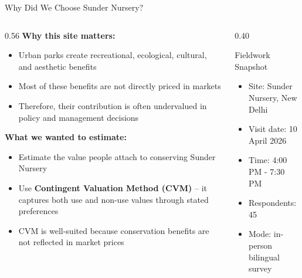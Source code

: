 \documentclass[10pt, aspectratio=169]{beamer}
\begin{document}
\begin{frame}{Why Did We Choose Sunder Nursery?}
    \begin{columns}[T]
        \begin{column}{0.56\textwidth}
            \textbf{Why this site matters:}
            \begin{itemize}
                \item Urban parks create recreational, ecological, cultural, and aesthetic benefits
                \item Most of these benefits are not directly priced in markets
                \item Therefore, their contribution is often undervalued in policy and management decisions
            \end{itemize}

            \vspace{0.5em}
            \textbf{What we wanted to estimate:}
            \begin{itemize}
                \item Estimate the value people attach to conserving Sunder Nursery
                \item Use \textbf{Contingent Valuation Method (CVM)} -- it captures both use and non-use values through stated preferences
                \item CVM is well-suited because conservation benefits are not reflected in market prices
            \end{itemize}
        \end{column}
        \begin{column}{0.40\textwidth}
            \begin{block}{Fieldwork Snapshot}
                \small
                \begin{itemize}
                    \item Site: Sunder Nursery, New Delhi
                    \item Visit date: 10 April 2026
                    \item Time: 4:00 PM - 7:30 PM
                    \item Respondents: 45
                    \item Mode: in-person bilingual survey
                \end{itemize}
            \end{block}
        \end{column}
    \end{columns}
\end{frame}
\end{document}
